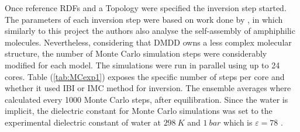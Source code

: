 \documentclass[10pt,a4paper,twoside]{article}
\begin{document}
 Once reference RDFs and a Topology were specified the inversion step started. The parameters of each inversion step were based on work done by , in which similarly to this project the authors also analyse the self-assembly of amphiphilic molecules. Nevertheless, considering that DMDD owns a less complex molecular structure, the number of Monte Carlo simulation steps were considerably modified for each model. The simulations were run in parallel using up to 24 cores. Table (\ref{tab:MCexp1}) exposes the specific number of steps per core and whether it used IBI or IMC method for inversion. The ensemble  averages where calculated every 1000 Monte Carlo steps, after equilibration. Since the water is implicit, the dielectric constant for Monte Carlo simulations was set to the experimental dielectric constant of water at $298\ K$ and $1\ bar$ which is $\varepsilon = 78$ \cite{dconst}. 
 
\end{document}
